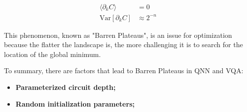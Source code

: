\begin{align}
    \langle \partial_k C\rangle &= 0  \label{Vanish Gradient}\\
    \mathrm{Var}[\partial_k C] &\approx 2^{-n}  \label{Variance expo smaller}
\end{align}

This phenomenon, known as "Barren Plateaus", is an issue for optimization because the flatter the landscape is, the more challenging it is to search for the location of the global minimum.

To summary, there are factors that lead to Barren Plateaus in QNN and VQA:
\begin{itemize}
    \item \textbf{Parameterized circuit depth;}
    \item \textbf{Random initialization parameters;}
\end{itemize}